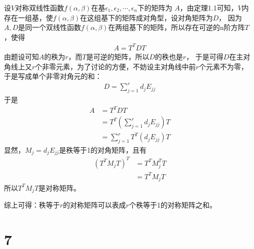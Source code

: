 \documentclass{article}
\begin{document}
设$V$对称双线性函数$f(\alpha, \beta)$在基$\epsilon_1, \epsilon_2, \cdots, \epsilon_n$下的矩阵为
$A$，由定理1.1可知，$V$内存在一组基，使$f(\alpha, \beta)$在这组基下的矩阵成对角型，设对角矩阵为$D$，
因为$A,D$是同一个双线性函数$f(\alpha, \beta)$在两组基下的矩阵，所以存在可逆的n阶方阵$T$，使得
\begin{align*}
  A = T^{T} D T
\end{align*}
由题设可知$A$的秩为$r$，而$T$是可逆的矩阵，所以$D$的秩也是$r$，
于是可得$D$在主对角线上又$r$个非零元素，为了讨论的方便，不妨设主对角线中前$r$个元素不为零，
于是写成单个非零对角元的和：
\begin{align*}
  D = \sum \limits_{j = 1}^r d_j E_{jj}
\end{align*}
于是
\begin{align*}
  A & = T^{T} D T                                 \\
    & = T^T (\sum \limits_{j = 1}^r d_j E_{jj}) T \\
    & = \sum \limits_{j = 1}^r T^T (d_j E_{jj}) T
\end{align*}
显然，$M_j = d_j E_{jj}$是秩等于1的对角矩阵，且有
\begin{align*}
  (T^T M_j T)^T
   & = T^T M_j^T T \\
   & = T^T M_j T
\end{align*}
所以$T^T M_j T$是对称矩阵。

综上可得：秩等于$r$的对称矩阵可以表成$r$个秩等于1的对称矩阵之和。

\section*{7}
\end{document}

